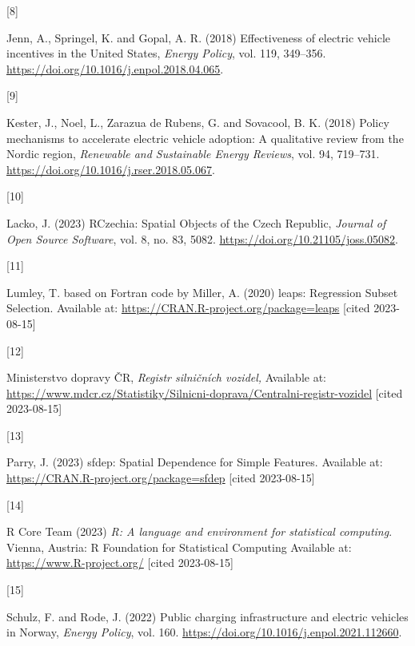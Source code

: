 \documentclass{mmeproc}
\newlength{\cslhangindent}
\newlength{\csllabelwidth}
\newenvironment{CSLReferences}[2] %
 {%
  \setlength{\parindent}{0pt}
  \ifodd #1
  \fi
  \setlength{\parskip}{-2pt}
 }%
 {}
\newcommand{\CSLLeftMargin}[1]{\parbox[t]{\csllabelwidth}{#1}}
\newcommand{\CSLRightInline}[1]{\parbox[t]{\linewidth - \csllabelwidth}{#1}\break}
\begin{document}
\begin{CSLReferences}{0}{0}
\leavevmode{}%
\CSLLeftMargin{{[}8{]} }%
\CSLRightInline{Jenn, A., Springel, K. and Gopal, A. R. (2018) {Effectiveness
of electric vehicle incentives in the {United} {States},} \emph{Energy
Policy}, vol. 119, 349--356. \url{https://doi.org/10.1016/j.enpol.2018.04.065}.}

\leavevmode{}%
\CSLLeftMargin{{[}9{]} }%
\CSLRightInline{Kester, J., Noel,  L., Zarazua de Rubens,  G. and 
Sovacool, B. K. (2018) {Policy mechanisms to accelerate electric vehicle adoption:
{A} qualitative review from the {Nordic} region,} \emph{Renewable and
Sustainable Energy Reviews}, vol. 94, 719--731. \url{https://doi.org/10.1016/j.rser.2018.05.067}.}

\leavevmode{}%
\CSLLeftMargin{{[}10{]} }%
\CSLRightInline{Lacko, J. (2023)  {{RCzechia}: {Spatial} {Objects} of the
{Czech} {Republic},} \emph{Journal of Open Source Software}, vol. 8,
no. 83, 5082. \url{https://doi.org/10.21105/joss.05082}.}

\leavevmode{}%
\CSLLeftMargin{{[}11{]} }%
\CSLRightInline{Lumley, T. based on Fortran code by Miller, A. (2020)
{{leaps}: {Regression} {Subset} {Selection}.} Available at:
\url{https://CRAN.R-project.org/package=leaps} {{[}cited 2023-08-15{]}}}

\leavevmode{}%
\CSLLeftMargin{{[}12{]} }%
\CSLRightInline{Ministerstvo dopravy ČR, \emph{Registr silničních
vozidel,} Available at:
\url{https://www.mdcr.cz/Statistiky/Silnicni-doprava/Centralni-registr-vozidel} {{[}cited 2023-08-15{]}}}

\leavevmode{}%
\CSLLeftMargin{{[}13{]} }%
\CSLRightInline{Parry, J. (2023) {{sfdep}: {Spatial} {Dependence} for
{Simple} {Features}.} Available at:
\url{https://CRAN.R-project.org/package=sfdep} {{[}cited 2023-08-15{]}}}

\leavevmode{}%
\CSLLeftMargin{{[}14{]} }%
\CSLRightInline{R Core Team (2023) \emph{R: A language and environment for
statistical computing}. Vienna, Austria: R Foundation for Statistical
Computing Available at: \url{https://www.R-project.org/} {{[}cited 2023-08-15{]}}}

\leavevmode{}%
\CSLLeftMargin{{[}15{]} }%
\CSLRightInline{Schulz, F. and Rode, J. (2022) {Public charging infrastructure
and electric vehicles in {Norway},} \emph{Energy Policy}, vol. 160. 
\url{https://doi.org/10.1016/j.enpol.2021.112660}.}


\end{CSLReferences}
\end{document}
